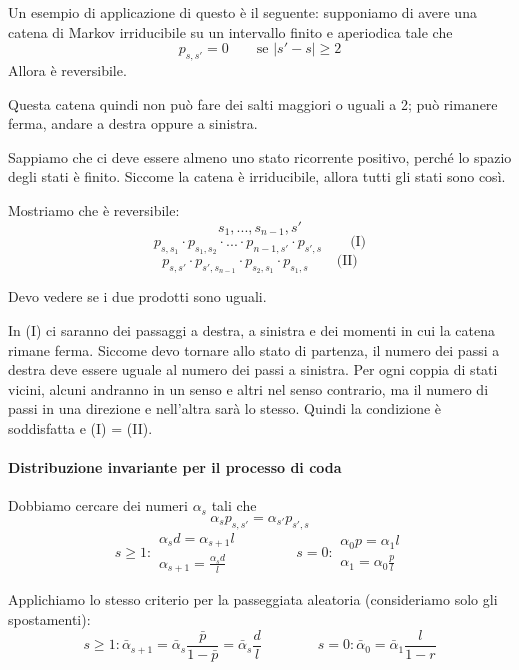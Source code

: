 \documentclass[a4paper,12pt]{book}
\newcommand\ddfrac[2]{\frac{\displaystyle #1}{\displaystyle #2}}
\begin{document}
Un esempio di applicazione di questo è il seguente: supponiamo di avere una catena di Markov irriducibile su un intervallo finito e aperiodica tale che
$$ p_{s,s'} = 0 \qquad \text{se } | s' - s | \ge 2 $$
Allora è reversibile. 



Questa catena quindi non può fare dei salti maggiori o uguali a 2; può rimanere ferma, andare a destra oppure a sinistra. 

Sappiamo che ci deve essere almeno uno stato ricorrente positivo, perché lo spazio degli stati è finito. Siccome la catena è irriducibile, allora tutti gli stati sono così. 

Mostriamo che è reversibile:
$$ s_1, ..., s_{n-1}, s' $$
$$ p_{s, s_1} \cdot p_{s_1, s_2} \cdot ... \cdot p_{n-1, s'} \cdot p_{s',s} \qquad \text{(I)}$$ 
$$ p_{s,s'} \cdot p_{s', s_{n-1}} \cdot p_{s_2, s_1} \cdot p_{s_1, s} \qquad \text{(II)}$$

Devo vedere se i due prodotti sono uguali. 

In (I) ci saranno dei passaggi a destra, a sinistra e dei momenti in cui la catena rimane ferma. Siccome devo tornare allo stato di partenza, il numero dei passi a destra deve essere uguale al numero dei passi a sinistra. Per ogni coppia di stati vicini, alcuni andranno in un senso e altri nel senso contrario, ma il numero di passi in una direzione e nell'altra sarà lo stesso.  Quindi la condizione è soddisfatta e (I) = (II).

\paragraph{Distribuzione invariante per il processo di coda} Dobbiamo cercare dei numeri $ \alpha_s $ tali che 
$$ \alpha_{s}p_{s,s'} = \alpha_{s'}p_{s',s} $$
$$ s \ge 1: \begin{array}{c}
	\alpha_{s}d = \alpha_{s+1}l \\
	\alpha_{s+1} = \ddfrac{\alpha_{s}d}{l}
\end{array} \qquad \qquad s = 0: \begin{array}{c}
	\alpha_{0}p = \alpha_{1} l \\
	\alpha_{1} = \alpha_{0}\ddfrac{p}{l}
\end {array} $$

Applichiamo lo stesso criterio per la passeggiata aleatoria (consideriamo solo gli spostamenti):
$$ s \ge 1: 
	\bar{\alpha}_{s+1} = \bar{\alpha}_s \ddfrac{\bar{p}}{1-\bar{p}} = \bar{\alpha}_s \ddfrac{d}{l}
	\qquad \qquad s = 0: 
	\bar{\alpha}_{0} = \bar{\alpha}_{1} \ddfrac{l}{1-r}
$$
\end{document}
